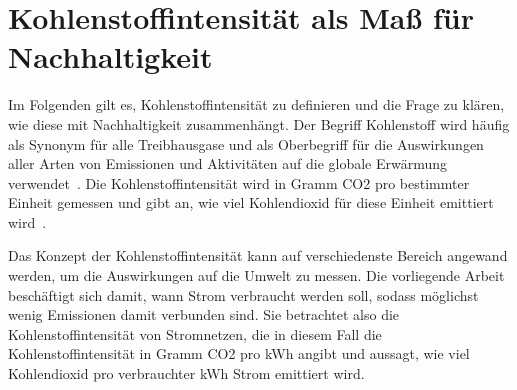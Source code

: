 %

\section{Kohlenstoffintensität als Maß für Nachhaltigkeit}\label{CAP:ci}
Im Folgenden gilt es, Kohlenstoffintensität zu definieren und die Frage zu klären, wie diese mit Nachhaltigkeit zusammenhängt.
Der Begriff Kohlenstoff wird häufig als Synonym für alle Treibhausgase und als Oberbegriff für die Auswirkungen aller Arten von Emissionen und Aktivitäten auf die globale Erwärmung verwendet~\cite{GreenSoftwareFoundation.2022}.
Die Kohlenstoffintensität wird in Gramm \ac{CO2} pro bestimmter Einheit gemessen und gibt an, wie viel Kohlendioxid für diese Einheit emittiert wird~\cite{LyndonRuff.20220420T15:34:17.000Z}.

Das Konzept der Kohlenstoffintensität kann auf verschiedenste Bereich angewand werden, um die Auswirkungen auf die Umwelt zu messen.
Die vorliegende Arbeit beschäftigt sich damit, wann Strom verbraucht werden soll, sodass möglichst wenig Emissionen damit verbunden sind.
Sie betrachtet also die Kohlenstoffintensität von Stromnetzen, die in diesem Fall die Kohlenstoffintensität in Gramm \ac{CO2} pro \ac{kWh} angibt und aussagt, wie viel Kohlendioxid pro verbrauchter \ac{kWh} Strom emittiert wird.

